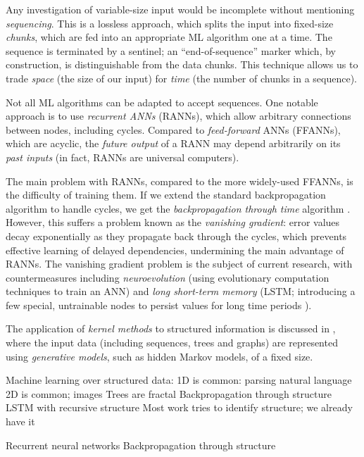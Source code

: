 Any investigation of variable-size input would be incomplete without mentioning
\emph{sequencing}. This is a lossless approach, which splits the input into
fixed-size \emph{chunks}, which are fed into an appropriate ML algorithm one at
a time. The sequence is terminated by a sentinel; an ``end-of-sequence'' marker
which, by construction, is distinguishable from the data chunks. This technique
allows us to trade \emph{space} (the size of our input) for \emph{time} (the
number of chunks in a sequence).

Not all ML algorithms can be adapted to accept sequences. One notable approach
is to use \emph{recurrent ANNs} (RANNs), which allow arbitrary connections
between nodes, including cycles. Compared to \emph{feed-forward} ANNs (FFANNs),
which are acyclic, the \emph{future output} of a RANN may depend arbitrarily on
its \emph{past inputs} (in fact, RANNs are universal computers).

The main problem with RANNs, compared to the more widely-used FFANNs, is the
difficulty of training them. If we extend the standard backpropagation algorithm
to handle cycles, we get the \emph{backpropagation through time} algorithm
\cite{werbos1990backpropagation}. However, this suffers a problem known as the
\emph{vanishing gradient}: error values decay exponentially as they propagate
back through the cycles, which prevents effective learning of delayed
dependencies, undermining the main advantage of RANNs. The vanishing gradient
problem is the subject of current research, with countermeasures including
\emph{neuroevolution} (using evolutionary computation techniques to train an
ANN) and \emph{long short-term memory} (LSTM; introducing a few special,
untrainable nodes to persist values for long time periods
\cite{hochreiter1997long}).

The application of \emph{kernel methods} to structured information is discussed
in \cite{Gartner2003}, where the input data (including sequences, trees and
graphs) are represented using \emph{generative models}, such as hidden Markov
models, of a fixed size.

\cite{Gartner2003}
\cite{Oveisi.Oveisi.Erfanian.ea:2012}
\cite{bakir2007predicting}
\cite{conf/ijcai/Plate91}
\cite{goller1996learning}
\cite{kwasny1995tail}
\cite{pollack1990recursive}
\cite{zanzotto2012distributed}

Machine learning over structured data:
1D is common: parsing natural language
2D is common; images
Trees are fractal
Backpropagation through structure
LSTM with recursive structure
Most work tries to identify structure; we already have it

Recurrent neural networks
Backpropagation through structure
